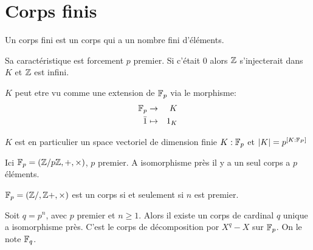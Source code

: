 
\section{Corps finis}

Un corps fini est un corps qui a un nombre fini d'éléments.

Sa caractéristique est forcement $p$ premier.
Si c'était 0 alors $\mathbb{Z}$ s'injecterait dans $K$ et $\mathbb{Z}$ est infini.

$K$ peut etre vu comme une extension de $\mathbb{F}_p$ via le morphisme:
\begin{eqnarray*}
	\mathbb{F}_p & \to & K \\
	\bar{1} &\mapsto& 1_K
\end{eqnarray*}

$K$ est en particulier un space vectoriel de dimension finie ${K:\mathbb{F}_p}$ et $|K| = p ^{[K:\mathbb{F}_P]} $


Ici $\mathbb{F}_p = \left( \mathbb{Z}/p\mathbb{Z}, +, \times \right)$, $p$ premier.
A isomorphisme près il y a un seul corps a $p$ éléments.

$\mathbb{F}_p = \left( \mathbb{Z}/,\mathbb{Z} +, \times \right)$ est un corps si et seulement si $n$ est premier.

\begin{theorem}
	Soit $q = p^n$, avec $p$ premier et $n \geq 1$. Alors il existe un corps de cardinal $q$ unique a isomorphisme près.
	C'est le corps de décomposition por $X^q-X$ sur $\mathbb{F}_p$. On le note $\mathbb{F}_q$.
\end{theorem}

